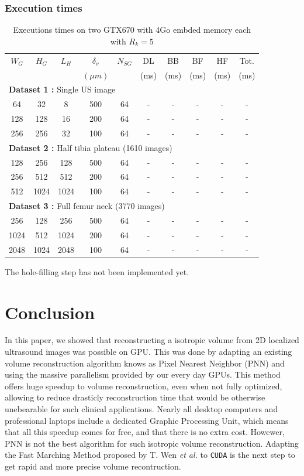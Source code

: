 \documentclass[12pt,journal,compsoc]{IEEEtran}
\begin{document}
\subsubsection{Execution times}

\begin{table}[!hb]
\renewcommand{\arraystretch}{1.3}
\caption{Executions times on two GTX670 with 4Go embded memory each with $R_k=5$}
\label{memory_table}
\centering
\begin{tabular}{|c|c|c||c|c||c|c|c|c||c|}
\hline
$W_G$ & $H_G$ & $L_H$ & $\delta_v$ & $N_{SG}$ & DL & BB & BF & HF & Tot. \\
      &&&$(\mu m)$&&(ms)&(ms)&(ms)&(ms)&(ms)\\
\hline
\multicolumn{10}{|l|}{\textbf{Dataset 1 :} Single US image}\\
\hline
64&32&8&500&64&-&-&-&-&-\\
\hline
128&128&16&200&64&-&-&-&-&-\\
\hline
256&256&32&100&64&-&-&-&-&-\\
\hline
\hline
\multicolumn{10}{|l|}{\textbf{Dataset 2 :} Half tibia plateau (1610 images)}\\
\hline
128&256&128&500&64&-&-&-&-&-\\
\hline
256&512&512&200&64&-&-&-&-&-\\
\hline
512&1024&1024&100&64&-&-&-&-&-\\
\hline
\hline
\multicolumn{10}{|l|}{\textbf{Dataset 3 :} Full femur neck (3770 images)}\\
\hline
256&128&256&500&64&-&-&-&-&-\\
\hline
1024&512&1024&200&64&-&-&-&-&-\\
\hline
2048&1024&2048&100&64&-&-&-&-&-\\
\hline
\end{tabular}
\end{table}

The hole-filling step has not been implemented yet.

\newpage
\section{Conclusion}
In this paper, we showed that reconstructing a isotropic volume from 2D localized ultrasound images was possible on GPU.
This was done by adapting an existing volume reconstruction algorithm knows as Pixel Nearest Neighbor (PNN) and using the massive parallelism provided by our every day GPUs.
This method offers huge speedup to volume reconstruction, even when not fully optimized, allowing to reduce drasticly reconstruction time that would be otherwise unebearable for such clinical applications.
Nearly all desktop computers and professional laptops include a dedicated Graphic Processing Unit, which means that all this speedup comes for free, and that there is no extra cost.
Howewer, PNN is not the best algorithm for such isotropic volume reconstruction. Adapting the Fast Marching Method proposed by T. Wen \textit{et al.} \cite{2} to \texttt{CUDA} is the next step to get rapid and more precise volume recontruction.
\end{document}
